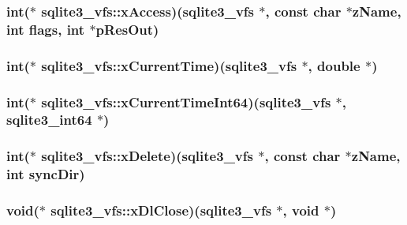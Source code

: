 \hypertarget{structsqlite3__vfs_ab4344474034c2dbc9223a362c65ff235}{
\subsubsection[{x\-Access}]{\setlength{\rightskip}{0pt plus 5cm}int($\ast$ sqlite3\-\_\-vfs\-::x\-Access)({\bf sqlite3\-\_\-vfs} $\ast$, const char $\ast${\bf z\-Name}, int flags, int $\ast$p\-Res\-Out)}}\label{structsqlite3__vfs_ab4344474034c2dbc9223a362c65ff235}
\hypertarget{structsqlite3__vfs_ab85a8a3ab59f76a6685508fefaa7b691}{
\subsubsection[{x\-Current\-Time}]{\setlength{\rightskip}{0pt plus 5cm}int($\ast$ sqlite3\-\_\-vfs\-::x\-Current\-Time)({\bf sqlite3\-\_\-vfs} $\ast$, double $\ast$)}}\label{structsqlite3__vfs_ab85a8a3ab59f76a6685508fefaa7b691}
\hypertarget{structsqlite3__vfs_aa281584c422969b7f0df0e5f918fc590}{
\subsubsection[{x\-Current\-Time\-Int64}]{\setlength{\rightskip}{0pt plus 5cm}int($\ast$ sqlite3\-\_\-vfs\-::x\-Current\-Time\-Int64)({\bf sqlite3\-\_\-vfs} $\ast$, {\bf sqlite3\-\_\-int64} $\ast$)}}\label{structsqlite3__vfs_aa281584c422969b7f0df0e5f918fc590}
\hypertarget{structsqlite3__vfs_a5f547a3e54f91c7ebef140d51054bbc0}{
\subsubsection[{x\-Delete}]{\setlength{\rightskip}{0pt plus 5cm}int($\ast$ sqlite3\-\_\-vfs\-::x\-Delete)({\bf sqlite3\-\_\-vfs} $\ast$, const char $\ast${\bf z\-Name}, int sync\-Dir)}}\label{structsqlite3__vfs_a5f547a3e54f91c7ebef140d51054bbc0}
\hypertarget{structsqlite3__vfs_adaa986b55a44971e7048d160ac5071ad}{
\subsubsection[{x\-Dl\-Close}]{\setlength{\rightskip}{0pt plus 5cm}void($\ast$ sqlite3\-\_\-vfs\-::x\-Dl\-Close)({\bf sqlite3\-\_\-vfs} $\ast$, void $\ast$)}}\label{structsqlite3__vfs_adaa986b55a44971e7048d160ac5071ad}

